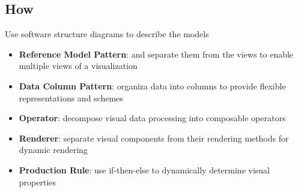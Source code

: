 \documentclass[]{article}
\theoremstyle{definition}
\begin{document}
	\subsection{How}
	Use software structure diagrams to describe the models
	\begin{itemize}
		\item \textbf{Reference Model Pattern}: and separate them from the views to enable multiple views of a visualization
		\item \textbf{Data Column Pattern}: organiza data into columns to provide flexible representations and schemes
		\item \textbf{Operator}: decompose visual data processing into composable operators
		\item \textbf{Renderer}: separate visual components from their rendering methods for dynamic rendering
		\item \textbf{Production Rule}: use if-then-else to dynamically determine visual properties
	\end{itemize}
\end{document}
